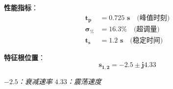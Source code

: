 \begin{tcolorbox}[colback=green!5!white,colframe=green!75!black,title=具体例：欠阻尼二阶系统 $G(s) = \dfrac{25}{s^2+5s+25}$,boxsep=3pt,left=3pt,right=3pt,top=3pt,bottom=3pt]
\begin{minipage}[b]{0.39\textwidth}
\textbf{性能指标}：
\begin{align*}
\mathbf{t_p} &\mathbf{= 0.725 \text{ s}} \quad \text{(峰值时刻)} \\
\mathbf{\sigma_\%} &\mathbf{= 16.3\%} \quad \text{(超调量)} \\
\mathbf{t_s} &\mathbf{= 1.2 \text{ s}} \quad \text{(稳定时间)}
\end{align*}

\textbf{特征根位置}：
$$\mathbf{s_{1,2} = -2.5 \pm j4.33}$$
\vspace{0.2cm}

{\small \textit{$-2.5$：衰减速率  \quad $4.33$：震荡速度}}

\end{minipage}

\end{tcolorbox}